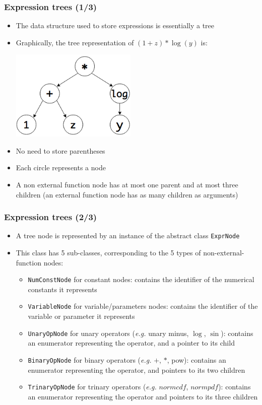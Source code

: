 \documentclass{beamer}
\begin{document}
\begin{frame}
  \frametitle{Expression trees (1/3)}
  \begin{itemize}
  \item The data structure used to store expressions is essentially a \alert{tree}
  \item Graphically, the tree representation of $(1+z)*\log(y)$ is:
    \begin{center}
      \includegraphics[width=6cm]{expr.png}
    \end{center}
  \item No need to store parentheses
  \item Each circle represents a \alert{node}
  \item A non external function node has at most one parent and at most three children (an external function node has as many children as arguments)
  \end{itemize}
\end{frame}

\begin{frame}
  \frametitle{Expression trees (2/3)}
  \begin{itemize}
  \item A tree node is represented by an instance of the abstract class \texttt{ExprNode}
  \item This class has 5 sub-classes, corresponding to the 5 types of non-external-function nodes:
    \begin{itemize}
    \item \texttt{NumConstNode} for constant nodes: contains the identifier of the numerical constants it represents
    \item \texttt{VariableNode} for variable/parameters nodes: contains the identifier of the variable or parameter it represents
    \item \texttt{UnaryOpNode} for unary operators (\textit{e.g.} unary minus, $\log$, $\sin$): contains an enumerator representing the operator, and a pointer to its child
    \item \texttt{BinaryOpNode} for binary operators (\textit{e.g.} $+$, $*$, pow): contains an enumerator representing the operator, and pointers to its two children
    \item \texttt{TrinaryOpNode} for trinary operators (\textit{e.g.} $normcdf$, $normpdf$): contains an enumerator representing the operator and pointers to its three children
    \end{itemize}
  \end{itemize}
\end{frame}
\end{document}
